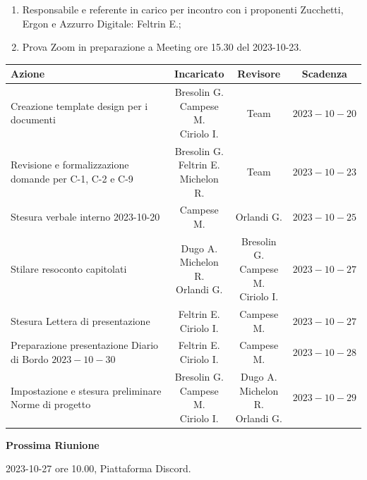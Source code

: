 \documentclass{article}
\begin{document}
\begin{paracol}{2}
\begin{enumerate}
\begin{itemize}
\end{itemize}
     
    
\end{enumerate}

\vspace{7.5em}

\begin{enumerate}
    \item  Responsabile e referente in carico per incontro con i proponenti Zucchetti, Ergon e Azzurro Digitale: Feltrin E.;
    \item Prova Zoom in preparazione a Meeting ore 15.30 del 2023-10-23.
   
\end{enumerate}

\end{paracol}

\newpage


{\renewcommand{\arraystretch}{1.5}
\begin{tabularx}{\textwidth}{X|c|c|c}
\textbf{Azione} & \textbf{Incaricato} & \textbf{Revisore} & \textbf{Scadenza} \\
\hline
Creazione template design per i documenti & \quantities{ Bresolin G. \\ Campese M. \\ Ciriolo I.} & Team & $2023-10-20$ \\
\hline
Revisione e formalizzazione domande per C-1, C-2 e C-9 & \quantities{ Bresolin G. \\ Feltrin E. \\ Michelon R.}& Team & $2023-10-23$ \\
\hline
Stesura verbale interno 2023-10-20 & Campese M. & Orlandi G. & $2023-10-25$ \\
\hline
Stilare resoconto capitolati &  \quantities{ Dugo A. \\ Michelon R. \\ Orlandi G.}& \quantities{ Bresolin G. \\ Campese M. \\ Ciriolo I.} & $2023-10-27$ \\
\hline Stesura Lettera di presentazione & \quantities{ Feltrin E.\\ Ciriolo I.} & Campese M.& $2023-10-27$\\
\hline Preparazione presentazione Diario di Bordo $2023-10-30$ & \quantities{ Feltrin E.\\ Ciriolo I.} & Campese M.& $2023-10-28$\\
\hline
Impostazione e stesura  preliminare Norme di progetto &  \quantities{ Bresolin G. \\ Campese M. \\ Ciriolo I.} & \quantities{ Dugo A. \\ Michelon R. \\ Orlandi G.} & $2023-10-29$ \\

\end{tabularx}}

\vspace{3em}


\textbf{Prossima Riunione}

2023-10-27 ore 10.00, Piattaforma Discord.
\end{document}
